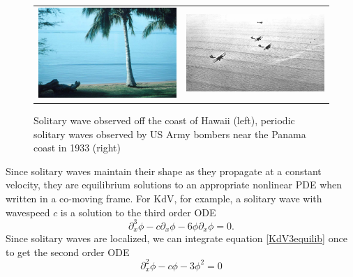 \documentclass[thesis.tex]{subfiles}
\begin{document}
\begin{figure}
\begin{center}
\begin{tabular}{cc}
\includegraphics[width=7cm]{images/intro/beach.jpg} &
\includegraphics[width=7cm]{images/intro/cnoidal.jpg}
\end{tabular}
\caption[Solitary waves in nature]{Solitary wave observed off the coast of Hawaii \cite{ANDRIOPOULOS2009} (left), periodic solitary waves observed by US Army bombers near the Panama coast in 1933 (right) }
\label{fig:waterwave}
\end{center}
\end{figure}

Since solitary waves maintain their shape as they propagate at a constant velocity, they are equilibrium solutions to an appropriate nonlinear PDE when written in a co-moving frame. For KdV, for example, a solitary wave with wavespeed $c$ is a solution to the third order ODE 
\begin{equation}\label{KdV3equilib}
\partial_x^3 \phi - c \partial_x \phi - 6 \phi \partial_x \phi = 0.
\end{equation}
Since solitary waves are localized, we can integrate equation \cref{KdV3equilib} once to get the second order ODE
\begin{equation}\label{KdV3eq}
\partial_x^2 \phi - c \phi - 3 \phi^2 = 0
\end{equation}
\end{document}

